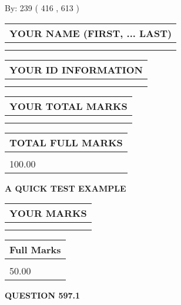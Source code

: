 \documentclass[12pt]{article}
\begin{document}
   
\hspace{1.0in} By: 
 239 ( 416 ,  613 )
   
   
   
   
\newpage 
\setcounter{page}{ 
   597001 } 
   
   
   
   
\noindent\begin{tabular}{|l|}
\hline
YOUR NAME (FIRST, ... LAST)  \\
\hline
 \\ 
 \\ 
\hline
\end{tabular}
\hspace{0.05in} \begin{tabular}{|l|}
\hline
 YOUR   ID   INFORMATION  \\
\hline
 \\ 
 \\ 
\hline
\end{tabular}
   
   
\vspace{0.2in}\noindent\begin{tabular}{|l|}
\hline
YOUR TOTAL MARKS  \\
\hline
 \\ 
 \\ 
\hline
\end{tabular}
\hspace{0.05in} \begin{tabular}{|l|}
\hline
TOTAL FULL MARKS  \\
\hline
 \\ 
100.00 \\
\hline
\end{tabular}
   
   
 \vspace{0.2in}
{\LARGE {\textbf{ A QUICK TEST EXAMPLE}}}
   
   
  
\vspace{0.2in}
  
\noindent\begin{tabular}{|l|}
\hline
 YOUR MARKS  \\
\hline
 \\ 
 \\ 
\hline
\end{tabular}
\hspace{0.05in} \begin{tabular}{|l|}
\hline
 Full Marks  \\
\hline
 \\ 
50.00 \\
\hline
\end{tabular}
{\textbf{\Large{QUESTION
597.1 
}}}
  
\end{document}
